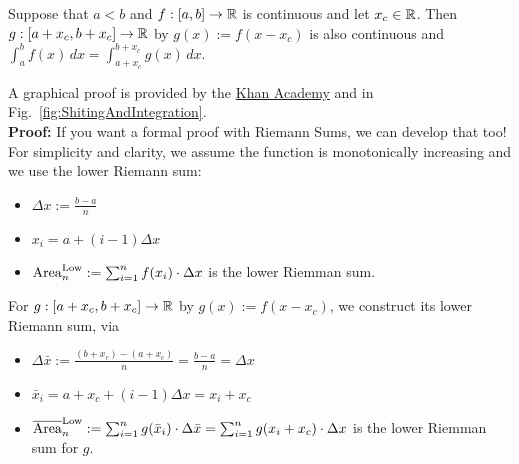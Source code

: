 \bigskip


\begin{tcolorbox}[title=\textcolor{black}{Proof of Prop.~\ref{thm:IntegralShiftProperty} (Shift Property)}, sharp corners, colback=green!30, colframe=green!80!blue, breakable, fonttitle=\bfseries]

Suppose that $a < b$ and $f:[a, b] \to \mathbb R$ is continuous and let $x_c \in \mathbb R$. Then $g:[a + x_c, b+x_c] \to \mathbb R$ by $g(x):=f(x-x_c)$ is also continuous and
$\int_a^b f(x) \, dx = \int_{a+x_c}^{b+x_c} g(x) \, dx$.

\end{tcolorbox}

\bigskip 

A graphical proof is provided by the \href{https://www.khanacademy.org/math/in-in-grade-12-ncert/xd340c21e718214c5:definite-integrals/xd340c21e718214c5:definite-integral-properties/v/definite-integral-shifted-function}{Khan Academy} and in Fig.~\ref{fig:ShitingAndIntegration}. \\


\textbf{Proof:} If you want a formal proof with Riemann Sums, we can develop that too! For simplicity and clarity, we assume the function is monotonically increasing and we use the lower Riemann sum:
\begin{itemize}
    \item $\Delta x := \frac{b-a}{n}$
    \item $x_i = a + (i-1) \Delta x$
      \item ${\rm Area}^{\rm Low}_n : = \sum_{i=1}^n f(x_i) \cdot \Delta x$ is the lower Riemman sum.
\end{itemize}


For $g:[a + x_c, b+x_c] \to \mathbb R$ by $g(x):=f(x-x_c)$, we construct its lower Riemann sum, via
\begin{itemize}
    \item $\Delta \bar{x} := \frac{(b+x_c)-(a+x_c)}{n} = \frac{b-a}{n} = \Delta x$
    \item $\bar{x}_i = a + x_c + (i-1) \Delta x = x_i+ x_c$
    \item $ \overline{{\rm Area}}^{\rm Low}_n : = \sum_{i=1}^n g(\bar{x}_i) \cdot \Delta \bar{x} = \sum_{i=1}^n g(x_i + x_c) \cdot \Delta x$ is the lower Riemman sum for $g$.
\end{itemize}

